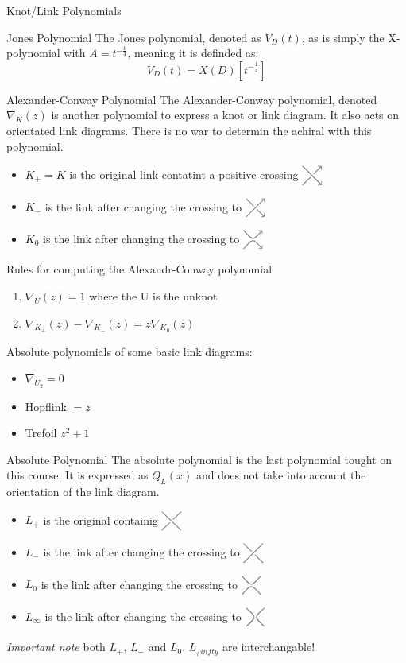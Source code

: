 \documentclass[12pt, letterpaper]{article}
\newcommand{\KP}[1]{%
  \begin{tikzpicture}[baseline=-\dimexpr\fontdimen22\textfont2\relax]
  #1
  \end{tikzpicture}%
}
\newcommand{\UCross}{%
  \KP{
    \draw[color=gray,thick] (-0.3,0.3) -- (0.3,-0.3);
    \draw[color=gray,thick] (-0.3,-0.3) -- (-0.05,-0.05);
    \draw[color=gray,thick] (0.05,0.05) -- (0.3,0.3);
  }%
}
\newcommand{\UOCross}{%
  \KP{
    \draw[color=gray,thick] (-0.3,0.3) -- (-0.05,0.05);
    \draw[color=gray,thick] (0.05,-0.05) -- (0.3,-0.3);
    \draw[color=gray,thick] (-0.3,-0.3) -- (0.3,0.3);
  }%
}
\newcommand{\DPCross}{%
  \KP{
    \draw[color=gray,thick,->] (-0.3,0.3) -- (0.3,-0.3);
    \draw[color=gray,thick] (-0.3,-0.3) -- (-0.05,-0.05);
    \draw[color=gray,thick,->] (0.05,0.05) -- (0.3,0.3);
  }%
}
\newcommand{\DNCross}{%
  \KP{
    \draw[color=gray,thick] (-0.3,0.3) -- (-0.05,0.05);
    \draw[color=gray,thick,->] (0.05,-0.05) -- (0.3,-0.3);
    \draw[color=gray,thick,->] (-0.3,-0.3) -- (0.3,0.3);
  }%
}
\newcommand{\RSmooth}{%
  \KP{%
    \draw[color=gray,thick] (-0.3,0.3)..controls (0,-0.05).. (0.3,0.3);
    \draw[color=gray,thick] (-0.3,-0.3)..controls (0,0.05).. (0.3,-0.3);
  }%
}
\newcommand{\LSmooth}{%
  \KP{%
    \draw[color=gray,thick] (-0.3,-0.3)..controls (0.05,0).. (-0.3,0.3);
    \draw[color=gray,thick] (0.3,-0.3)..controls (-0.05,0).. (0.3,0.3);
  }%
}
\newcommand{\DSmooth}{%
  \KP{%
    \draw[color=gray,thick,->] (-0.3,0.3)..controls (0,-0.05).. (0.3,0.3);
    \draw[color=gray,thick,->] (-0.3,-0.3)..controls (0,0.05).. (0.3,-0.3);
  }%
}
\begin{document}
\begin{section}{Knot/Link Polynomials}
  \begin{subsubsection}{Jones Polynomial}
    The Jones polynomial, denoted as \(V_{D}(t)\), as is simply the X-polynomial
    with \(A = t^{-\frac{1}{4}}\), meaning it is definded as:
    \[V_{D}(t) = X(D)[t^{-\frac{1}{4}}]\]
  \end{subsubsection}

  \begin{subsection}{Alexander-Conway Polynomial}
    The Alexander-Conway polynomial, denoted \(\nabla_{K}(z)\)
    is another polynomial to express a knot or link diagram. It also acts on
    orientated link diagrams.
    There is no war to determin the achiral with this polynomial.

    \begin{itemize}
      \item \(K_{+} = K\) is the original link contatint a positive crossing
            \(\DPCross\)
      \item \(K_{-}\) is the link after changing the crossing to \(\DNCross\)
      \item \(K_{0}\) is the link after changing the crossing to \(\DSmooth\)
    \end{itemize}

    Rules for computing the Alexandr-Conway polynomial
    \begin{enumerate}
      \item \(\nabla_{U}(z) = 1\) where the U is the unknot
      \item \(\nabla_{K_{+}}(z) - \nabla_{K_{-}}(z) = z\nabla_{K_{0}}(z)\)
    \end{enumerate}

    Absolute polynomials of some basic link diagrams:
    \begin{itemize}
      \item \(\nabla_{U_{2}} = 0\)
      \item Hopflink \(= z\)
      \item Trefoil \(z^{2} + 1\)
    \end{itemize}
  \end{subsection}

  \begin{subsection}{Absolute Polynomial}
    The absolute polynomial is the last polynomial tought on this course.
    It is expressed as \(Q_{L}(x)\) and does not take into account the orientation
    of the link diagram.

    \begin{itemize}
      \item \(L_{+}\) is the original containig \(\UCross\)
      \item \(L_{-}\) is the link after changing the crossing to \(\UOCross\)
      \item \(L_{0}\) is the link after changing the crossing to \(\RSmooth\)
      \item \(L_{\infty}\) is the link after changing the crossing to \(\LSmooth\)
    \end{itemize}
    \emph{Important note} both \(L_{+}\), \(L_{-}\) and  \(L_{0}\), \(L_{/infty}\)
    are interchangable!


\end{subsection}
\end{section}
\end{document}
